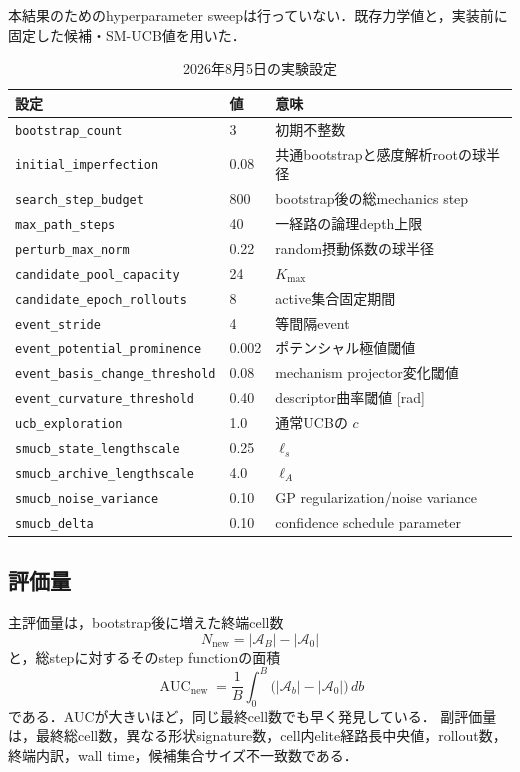 \documentclass[a4paper,11pt]{ltjsarticle}
\newcommand{\code}[1]{\nolinkurl{#1}}
\newcommand{\outarchive}{\mathcal A}
\begin{document}
本結果のためのhyperparameter sweepは行っていない．既存力学値と，実装前に固定した候補・SM-UCB値を用いた．
\begin{table}[H]
\centering
\caption{2026年8月5日の実験設定}
\begin{tabularx}{\linewidth}{p{52mm}p{28mm}Y}
\toprule
設定 & 値 & 意味\\
\midrule
\code{bootstrap_count} & 3 & 初期不整数\\
\code{initial_imperfection} & 0.08 & 共通bootstrapと感度解析rootの球半径\\
\code{search_step_budget} & 800 & bootstrap後の総mechanics step\\
\code{max_path_steps} & 40 & 一経路の論理depth上限\\
\code{perturb_max_norm} & 0.22 & random摂動係数の球半径\\
\code{candidate_pool_capacity} & 24 & \(K_{\max}\)\\
\code{candidate_epoch_rollouts} & 8 & active集合固定期間\\
\code{event_stride} & 4 & 等間隔event\\
\code{event_potential_prominence} & 0.002 & ポテンシャル極値閾値\\
\code{event_basis_change_threshold} & 0.08 & mechanism projector変化閾値\\
\code{event_curvature_threshold} & 0.40 & descriptor曲率閾値 [rad]\\
\code{ucb_exploration} & 1.0 & 通常UCBの \(c\)\\
\code{smucb_state_lengthscale} & 0.25 & \(\ell_s\)\\
\code{smucb_archive_lengthscale} & 4.0 & \(\ell_A\)\\
\code{smucb_noise_variance} & 0.10 & GP regularization/noise variance\\
\code{smucb_delta} & 0.10 & confidence schedule parameter\\
\bottomrule
\end{tabularx}
\end{table}

\subsection{評価量}

主評価量は，bootstrap後に増えた終端cell数
\begin{equation}
  N_{\mathrm{new}}=|\outarchive_B|-|\outarchive_0|
\end{equation}
と，総stepに対するそのstep functionの面積
\begin{equation}
  \operatorname{AUC}_{\mathrm{new}}
  =\frac1B\int_0^B
  \bigl(|\outarchive_b|-|\outarchive_0|\bigr)\,db
\end{equation}
である．AUCが大きいほど，同じ最終cell数でも早く発見している．
副評価量は，最終総cell数，異なる形状signature数，cell内elite経路長中央値，rollout数，
終端内訳，wall time，候補集合サイズ不一致数である．
\end{document}
